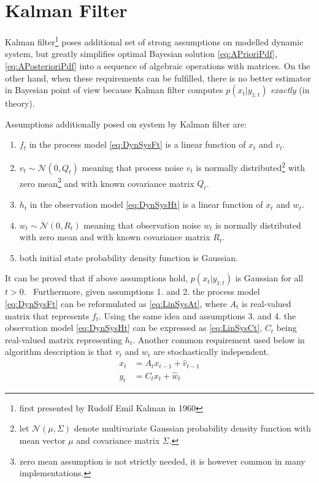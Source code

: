 \documentclass[a4paper,12pt,oneside]{report}
\newcommand{\pdf}{probability density function}
\begin{document}
\section{Kalman Filter}

Kalman filter\footnote{first presented by Rudolf Emil Kalman in 1960} poses additional set of strong
assumptions on modelled dynamic system, but greatly
simplifies optimal Bayesian solution \eqref{eq:APrioriPdf}, \eqref{eq:APosterioriPdf} into a
sequence of algebraic operations with matrices. On the other hand, when these requirements can be
fulfilled, there is no better estimator in Bayesian point of view because Kalman filter computes
\(p(x_t | y_{1:t})\) \emph{exactly} (in theory).

Assumptions additionally posed on system by Kalman filter are: %
\begin{enumerate}
	\item \(f_t\) in the process model \eqref{eq:DynSysFt} is a linear function of \(x_t\) and
	\(v_t\).
	\item \(v_t \sim \mathcal{N}(0, Q_t)\) meaning that process noise \(v_t\) is normally
	distributed\footnote{let \(\mathcal{N}(\mu, \Sigma)\) denote multivariate Gaussian {\pdf} with mean
	vector \(\mu\) and covariance matrix \(\Sigma\).}
	with zero mean\footnote{zero mean assumption is not strictly needed, it is however common in
	many implementations.} and with known covariance matrix \(Q_t\).
	\item \(h_t\) in the observation model \eqref{eq:DynSysHt} is a linear function of \(x_t\) and
	\(w_t\).
	\item \(w_t \sim \mathcal{N}(0, R_t)\) meaning that observation noise \(w_t\) is normally distributed
	with zero mean and with known covariance matrix \(R_t\).
	\item both initial state {\pdf} is Gaussian.
\end{enumerate}

It can be proved that if above assumptions hold, \(p(x_t|y_{1:t})\) is Gaussian for all
\(t > 0\).~\cite{AruMasGor:02} Furthermore, given assumptions 1. and 2. the process model
\eqref{eq:DynSysFt} can be reformulated as \eqref{eq:LinSysAt}, where \(A_t\) is real-valued matrix
that represents \(f_t\).
Using the same idea and assumptions 3. and 4. the observation model \eqref{eq:DynSysHt} can be
expressed as \eqref{eq:LinSysCt}, \(C_t\) being real-valued matrix representing \(h_t\). Another
common requirement used below in algorithm description is that \(v_t\) and \(w_t\) are
stochastically independent.
\begin{align}
	x_t &= A_t x_{t-1} + \hat{v}_{t-1} \label{eq:LinSysAt} \\
	y_t &= C_t x_t + \hat{w}_t \label{eq:LinSysCt}
\end{align}
\end{document}
